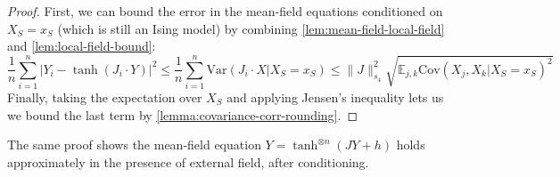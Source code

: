 \documentclass[11pt, oneside, english]{article}
\newcommand{\bE}{\mathbb{E}}
\newcommand{\Cov}{\mathrm{Cov}}
\newcommand{\Var}{\mathrm{Var}}
\newcommand{\E}{\bE}      %
\theoremstyle{definition}
\newtheorem{remark}[theorem]{Remark}
\theoremstyle{plain}
\begin{document}
\begin{proof}
First, we can bound the error in the mean-field equations conditioned on $X_S = x_S$ (which is still an Ising model) by combining \cref{lem:mean-field-local-field} and \cref{lem:local-field-bound}:
\[ \frac{1}{n} \sum_{i = 1}^n |Y_i - \tanh(J_i \cdot Y)|^2 \le \frac{1}{n} \sum_{i = 1}^n \Var(J_i \cdot X | X_S = x_S) \le \|J\|_{s_4}^2 \sqrt{\E_{j,k} \Cov(X_j,X_k | X_S = x_S)^2} \]
Finally, taking the expectation over $X_S$ and applying Jensen's inequality lets us we bound the last term by \cref{lemma:covariance-corr-rounding}.
\end{proof}
The same proof shows the mean-field equation $Y = \tanh^{\otimes n}(J Y + h)$ holds approximately in the presence of external field, after conditioning. 

\end{document}
